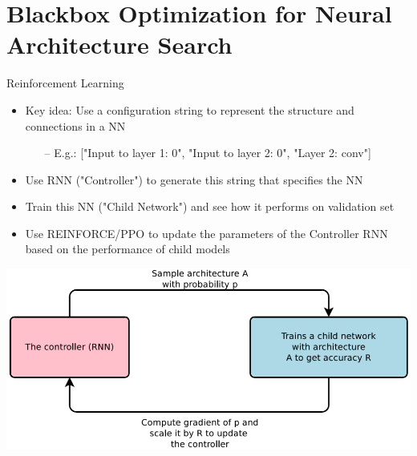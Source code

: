 \section{Blackbox Optimization for Neural Architecture Search}
\begin{frame}[c]{Reinforcement Learning }
\centering
\begin{itemize}
	\item Key idea: Use a configuration string to represent the structure and connections in a NN
	\begin{itemize}
		\item[--] E.g.: ["Input to layer 1: 0", "Input to layer 2: 0", "Layer 2: conv"]
	\end{itemize}
	\item Use RNN ("\alert{Controller}") to generate this string that specifies the NN
	\item Train this NN ("\alert{Child Network}") and see how it performs on validation set
	\item Use \alert{REINFORCE/PPO} to update the parameters of the Controller RNN based on the performance of
	child models
\end{itemize}

{\centering
	\includegraphics[width=.6\textwidth]{images_lec7/s27}
}
\end{frame}

